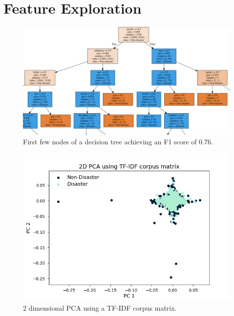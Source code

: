 \documentclass[journal, ]{IEEEtran}
\let\MYoriglatexcaption\caption
\renewcommand{\caption}[2][\relax]{\MYoriglatexcaption[#2]{#2}}
\begin{document}
\section{Feature Exploration}
\begin{figure}[hbt!]
  \centering
  \includegraphics[width=\linewidth]{../figures/decision_tree.png}
  \caption{First few nodes of a decision tree achieving an F1 score of 0.76.}
  \label{fig:decision_tree}
\end{figure}

\begin{figure}[hbt!]
  \centering
  \includegraphics[width=\linewidth]{../figures/pca.png}
  \caption{2 dimensional PCA using a TF-IDF corpus matrix.}
  \label{fig:pca}
\end{figure}
\end{document}
